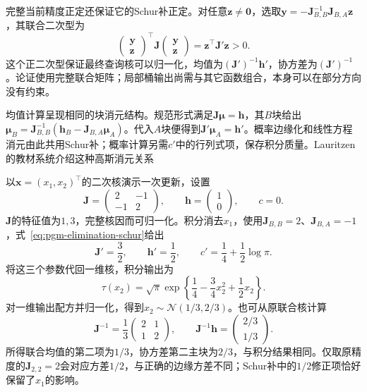完整当前精度正定还保证它的Schur补正定。对任意$\bm{z}\ne\bm{0}$，选取$\bm{y}=-\bm{J}_{B,B}^{-1}\bm{J}_{B,A}\bm{z}$，其联合二次型为
\[
  \begin{pmatrix}\bm{y}\\\bm{z}\end{pmatrix}^{\top}
  \bm{J}
  \begin{pmatrix}\bm{y}\\\bm{z}\end{pmatrix}
  =\bm{z}^{\top}\bm{J}'\bm{z}>0.
\]
这个正二次型保证最终查询核可以归一化，均值为$(\bm{J}')^{-1}\bm{h}'$，协方差为$(\bm{J}')^{-1}$。论证使用完整联合矩阵；局部桶输出尚需与其它函数组合，本身可以在部分方向没有约束。

均值计算呈现相同的块消元结构。规范形式满足$\bm{J}\bm{\mu}=\bm{h}$，其$B$块给出$\bm{\mu}_B=\bm{J}_{B,B}^{-1}(\bm{h}_B-\bm{J}_{B,A}\bm{\mu}_A)$。代入$A$块便得到$\bm{J}'\bm{\mu}_A=\bm{h}'$。概率边缘化和线性方程消元由此共用Schur补；概率计算另需$c'$中的行列式项，保存积分质量。Lauritzen的教材系统介绍这种高斯消元关系

\begin{example}[一个二维高斯核的积分]
  \label{ex:pgm-elimination-gaussian-numeric}
  以$\bm{x}=(x_1,x_2)^{\top}$的二次核演示一次更新，设置
  \[
    \bm{J}=\begin{pmatrix}2&-1\\-1&2\end{pmatrix},
    \qquad
    \bm{h}=\begin{pmatrix}1\\0\end{pmatrix},
    \qquad c=0.
  \]
  $\bm{J}$的特征值为$1,3$，完整核因而可归一化。积分消去$x_1$，使用$\bm{J}_{B,B}=2$、$\bm{J}_{B,A}=-1$，式~\eqref{eq:pgm-elimination-schur}给出
  \[
    \bm{J}'=\frac32,\qquad \bm{h}'=\frac12,\qquad
    c'=\frac14+\frac12\log\pi.
  \]
  将这三个参数代回一维核，积分输出为
  \[
    \tau(x_2)=\sqrt{\pi}\exp\!\left\{
      \frac14-\frac34x_2^2+\frac12x_2\right\}.
  \]
  对一维输出配方并归一化，得到$x_2\sim\mathcal{N}(1/3,2/3)$。也可从原联合核计算
  \[
    \bm{J}^{-1}=\frac13
      \begin{pmatrix}2&1\\1&2\end{pmatrix},
    \qquad
    \bm{J}^{-1}\bm{h}=
      \begin{pmatrix}2/3\\1/3\end{pmatrix}.
  \]
  所得联合均值的第二项为$1/3$，协方差第二主块为$2/3$，与积分结果相同。仅取原精度的$\bm{J}_{2,2}=2$会对应方差$1/2$，与正确的边缘方差不同；Schur补中的$1/2$修正项恰好保留了$x_1$的影响。
\end{example}

